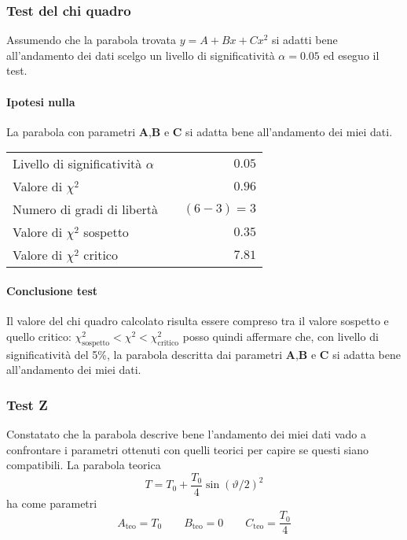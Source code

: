 \documentclass{article}
\begin{document}
	
	\subsubsection{Test del chi quadro}
	Assumendo che la parabola trovata $y=A+Bx+Cx^2$ si adatti bene all'andamento dei dati scelgo un livello di significatività $\alpha = 0.05$ ed eseguo il test.
	
	\paragraph{Ipotesi nulla} La parabola con parametri \textbf{A},\textbf{B} e \textbf{C} si adatta bene all'andamento dei miei dati.
	
	\vspace{0.7cm}
	\begin{table}[H]
		\centering
		\begin{tabular}{lr} 
			Livello di significatività $\alpha$		&$\quad 0.05$  \\
			Valore di $\chi ^2$             		& $\quad 0.96$       \\
			Numero di gradi di libertà      		& $\quad (6-3) = 3$         \\   
			Valore di $\chi ^2$ sospetto			& $\quad 0.35$ \\
			Valore di $\chi ^2$ critico     		& $\quad 7.81$
		\end{tabular}
	\end{table}
	\vspace{0.7cm}
	
	\paragraph{Conclusione test}
	Il valore del chi quadro calcolato risulta essere compreso tra il valore sospetto e quello critico: $\chi^2_\text{sospetto} < \chi ^2 < \chi^2_\text{critico}$ posso quindi affermare che, con livello di significatività del 5\%, la parabola descritta dai parametri \textbf{A},\textbf{B} e \textbf{C} si adatta bene all'andamento dei miei dati.
	
	
	\subsubsection{Test Z}
	Constatato che la parabola descrive bene l'andamento dei miei dati vado a confrontare i parametri ottenuti con quelli teorici per capire se questi siano compatibili. La parabola  teorica
	\[
	T = T_0 + \frac{T_0}{4}\sin{(\vartheta/2)}^2
	\]
	ha come parametri 
	\[
	A_\text{teo} = T_0 \qquad B_\text{teo} = 0 \qquad C_\text{teo} =  \frac{T_0}{4} 
	\]
	
\end{document}
